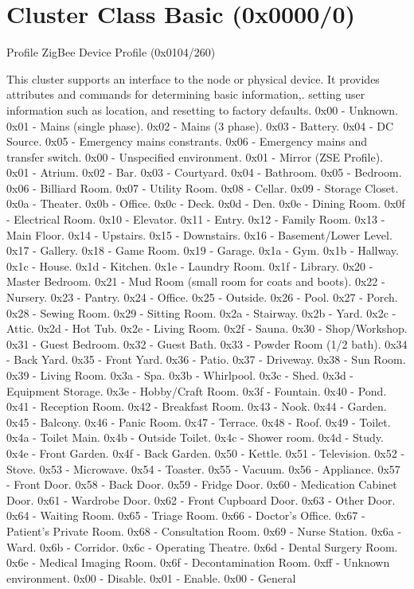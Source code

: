 \section{Cluster Class Basic (0x0000/0)}

Profile ZigBee Device Profile (0x0104/260)

This cluster supports an interface to the node or physical device. It provides attributes and commands for determining basic information,. setting user information such as location, and resetting to factory defaults. 				0x00 - Unknown. 				0x01 - Mains (single phase). 				0x02 - Mains (3 phase). 				0x03 - Battery. 				0x04 - DC Source. 				0x05 - Emergency mains constrants. 				0x06 - Emergency mains and transfer switch. 				0x00 - Unspecified environment. 				0x01 - Mirror (ZSE Profile). 				0x01 - Atrium. 				0x02 - Bar. 				0x03 - Courtyard. 				0x04 - Bathroom. 				0x05 - Bedroom. 				0x06 - Billiard Room. 				0x07 - Utility Room. 				0x08 - Cellar. 				0x09 - Storage Closet. 				0x0a - Theater. 				0x0b - Office. 				0x0c - Deck. 				0x0d - Den. 				0x0e - Dining Room. 				0x0f - Electrical Room. 				0x10 - Elevator. 				0x11 - Entry. 				0x12 - Family Room. 				0x13 - Main Floor. 				0x14 - Upstairs. 				0x15 - Downstairs. 				0x16 - Basement/Lower Level. 				0x17 - Gallery. 				0x18 - Game Room. 				0x19 - Garage. 				0x1a - Gym. 				0x1b - Hallway. 				0x1c - House. 				0x1d - Kitchen. 				0x1e - Laundry Room. 				0x1f - Library. 				0x20 - Master Bedroom. 				0x21 - Mud Room (small room for coats and boots). 				0x22 - Nursery. 				0x23 - Pantry. 				0x24 - Office. 				0x25 - Outside. 				0x26 - Pool. 				0x27 - Porch. 				0x28 - Sewing Room. 				0x29 - Sitting Room. 				0x2a - Stairway. 				0x2b - Yard. 				0x2c - Attic. 				0x2d - Hot Tub. 				0x2e - Living Room. 				0x2f - Sauna. 				0x30 - Shop/Workshop. 				0x31 - Guest Bedroom. 				0x32 - Guest Bath. 				0x33 - Powder Room (1/2 bath). 				0x34 - Back Yard. 				0x35 - Front Yard. 				0x36 - Patio. 				0x37 - Driveway. 				0x38 - Sun Room. 				0x39 - Living Room. 				0x3a - Spa. 				0x3b - Whirlpool. 				0x3c - Shed. 				0x3d - Equipment Storage. 				0x3e - Hobby/Craft Room. 				0x3f - Fountain. 				0x40 - Pond. 				0x41 - Reception Room. 				0x42 - Breakfast Room. 				0x43 - Nook. 				0x44 - Garden. 				0x45 - Balcony. 				0x46 - Panic Room. 				0x47 - Terrace. 				0x48 - Roof. 				0x49 - Toilet. 				0x4a - Toilet Main. 				0x4b - Outside Toilet. 				0x4c - Shower room. 				0x4d - Study. 				0x4e - Front Garden. 				0x4f - Back Garden. 				0x50 - Kettle. 				0x51 - Television. 				0x52 - Stove. 				0x53 - Microwave. 				0x54 - Toaster. 				0x55 - Vacuum. 				0x56 - Appliance. 				0x57 - Front Door. 				0x58 - Back Door. 				0x59 - Fridge Door. 				0x60 - Medication Cabinet Door. 				0x61 - Wardrobe Door. 				0x62 - Front Cupboard Door. 				0x63 - Other Door. 				0x64 - Waiting Room. 				0x65 - Triage Room. 				0x66 - Doctor’s Office. 				0x67 - Patient’s Private Room. 				0x68 - Consultation Room. 				0x69 - Nurse Station. 				0x6a - Ward. 				0x6b - Corridor. 				0x6c - Operating Theatre. 				0x6d - Dental Surgery Room. 				0x6e - Medical Imaging Room. 				0x6f - Decontamination Room. 				0xff - Unknown environment. 				0x00 - Disable. 				0x01 - Enable. 				0x00 - General 